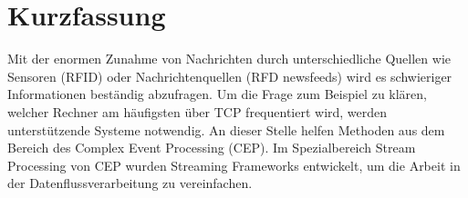 

\section*{Kurzfassung}
Mit der enormen Zunahme von Nachrichten durch unterschiedliche Quellen wie Sensoren (RFID) oder 
Nachrichtenquellen (RFD newsfeeds) wird es schwieriger Informationen beständig abzufragen. Um die
Frage zum Beispiel zu klären, welcher Rechner am häufigsten über TCP frequentiert wird, werden unterstützende 
Systeme notwendig. An dieser Stelle helfen Methoden aus dem Bereich des Complex Event Processing (CEP).
Im Spezialbereich Stream Processing von CEP wurden Streaming Frameworks entwickelt, 
um die Arbeit in der Datenflussverarbeitung zu vereinfachen.

